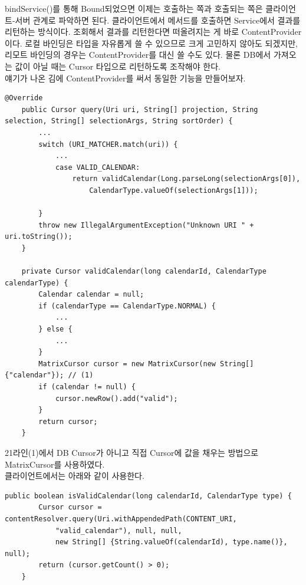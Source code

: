 bindService()를 통해 Bound되었으면 이제는 호출하는 쪽과 호출되는 쪽은 클라이언트-서버 관계로 파악하면 된다. 클라이언트에서 메서드를 호출하면 Service에서 결과를 리턴하는 방식이다. 
조회해서 결과를 리턴한다면 떠올려지는 게 바로 ContentProvider이다. 로컬 바인딩은 타입을 자유롭게 쓸 수 있으므로 크게 고민하지 않아도 되겠지만, 리모트 바인딩의 경우는 ContentProvider를 대신 쓸 수도 있다. 물론 DB에서 가져오는 값이 아닐 때는 Cursor 타입으로 리턴하도록 조작해야 한다.\\

얘기가 나온 김에 ContentProvider를 써서 동일한 기능을 만들어보자.
\begin{lstlisting}[frame=single]
	@Override
	public Cursor query(Uri uri, String[] projection, String selection, String[] selectionArgs, String sortOrder) {
		...
		switch (URI_MATCHER.match(uri)) {
			...
			case VALID_CALENDAR:
				return validCalendar(Long.parseLong(selectionArgs[0]), 
					CalendarType.valueOf(selectionArgs[1]));
				
		}
		throw new IllegalArgumentException("Unknown URI " + uri.toString());
	}

	private Cursor validCalendar(long calendarId, CalendarType calendarType) {
		Calendar calendar = null;
		if (calendarType == CalendarType.NORMAL) {
			...
		} else {
			...
		}
		MatrixCursor cursor = new MatrixCursor(new String[] {"calendar"}); // (1)
		if (calendar != null) {
			cursor.newRow().add("valid");
		}
		return cursor;
	}
\end{lstlisting}
21라인(1)에서 DB Cursor가 아니고 직접 Cursor에 값을 채우는 방법으로 MatrixCursor를 사용하였다.\\

클라이언트에서는 아래와 같이 사용한다.
\begin{lstlisting}[frame=single]
	public boolean isValidCalendar(long calendarId, CalendarType type) {
		Cursor cursor = contentResolver.query(Uri.withAppendedPath(CONTENT_URI, 
			"valid_calendar"), null, null, 
			new String[] {String.valueOf(calendarId), type.name()}, null);
		return (cursor.getCount() > 0);
	}
\end{lstlisting}

